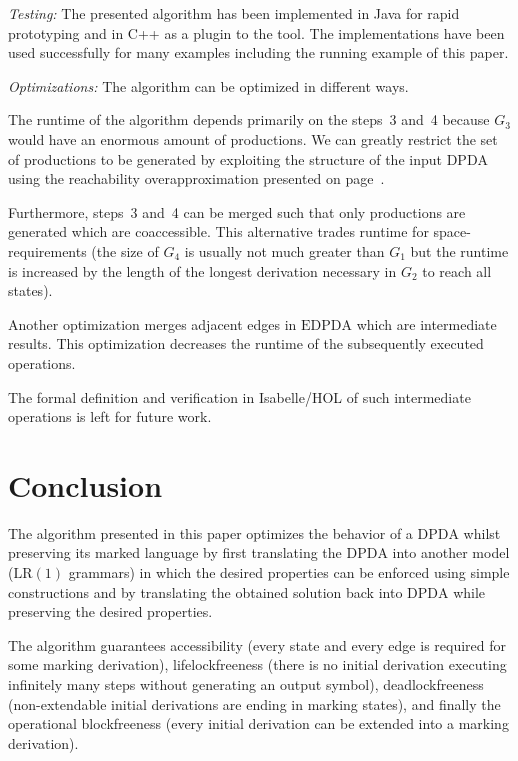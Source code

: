 \documentclass[draft]{ifacconf}
\newcommand{\STEP}[1]{\ensuremath{G_{#1}}\xspace}
\newcommand{\LR}[1][1]{\ensuremath{\mathrm{LR}(#1)}\xspace}
\newcommand{\DPDA}{\ensuremath{\mathrm{DPDA}}\xspace}
\newcommand{\EDPDA}{\ensuremath{\mathrm{EDPDA}}\xspace}
\newcommand{\myparagraph}[1]{\par\emph{#1:}}
\begin{document}
\myparagraph{Testing}
The presented algorithm has been implemented in Java for rapid prototyping and in C++ as a plugin to the \cite{libFAUDES} tool.
The implementations have been used successfully for many examples including the running example of this paper.

\myparagraph{Optimizations}
The algorithm can be optimized in different ways.
\begin{inparaenum}[(i)]
\item The runtime of the algorithm depends primarily on the steps~3 and~4 because \STEP{3} would have an enormous amount of productions. We can greatly restrict the set of productions to be generated by exploiting the structure of the input \DPDA using the reachability overapproximation presented on page~\pageref{mypar:ApproximatingAccessibility}.
\item Furthermore, steps~3 and~4 can be merged such that only productions are generated which are coaccessible.
This alternative trades runtime for space-requirements (the size of \STEP{4} is usually not much greater than \STEP{1} but the runtime is increased by the length of the longest derivation necessary in \STEP{2} to reach all states).
\item Another optimization merges adjacent edges in \EDPDA which are intermediate results. This optimization decreases the runtime of the subsequently executed operations.
\end{inparaenum}
The formal definition and verification in Isabelle/HOL of such intermediate operations is left for future work.

\section{Conclusion}\label{sect:SUM}
The algorithm presented in this paper optimizes the behavior of a \DPDA whilst preserving its marked language by first translating the \DPDA into another model (\LR grammars) in which the desired properties can be enforced using simple constructions and by translating the obtained solution back into \DPDA while preserving the desired properties.

The algorithm guarantees accessibility (every state and every edge is required for some marking derivation), lifelockfreeness (there is no initial derivation executing infinitely many steps without generating an output symbol), deadlockfreeness (non-extendable initial derivations are ending in marking states), and finally the operational blockfreeness (every initial derivation can be extended into a marking derivation).
\end{document}
